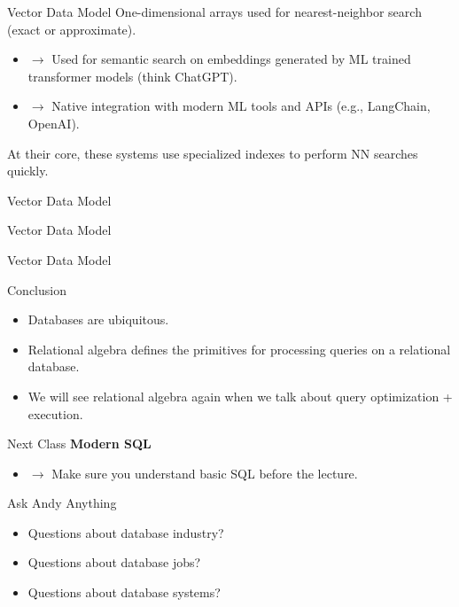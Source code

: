 \documentclass[aspectratio=169, 10pt]{beamer}
\begin{document}
\begin{frame}{Vector Data Model}
    One-dimensional arrays used for nearest-neighbor search (exact or approximate).
    \begin{itemize}
        \item $\rightarrow$ Used for semantic search on embeddings generated by ML trained transformer models (think ChatGPT).
        \item $\rightarrow$ Native integration with modern ML tools and APIs (e.g., LangChain, OpenAI).
    \end{itemize}
    At their core, these systems use specialized indexes to perform NN searches quickly.
    \vspace{1em}
    \centering

\end{frame}

\begin{frame}{Vector Data Model}
    \centering
  
\end{frame}

\begin{frame}{Vector Data Model}
    \centering
   
\end{frame}

\begin{frame}{Vector Data Model}
    \centering
    
\end{frame}

\begin{frame}{Conclusion}
    \begin{itemize}
        \item Databases are ubiquitous.
        \item Relational algebra defines the primitives for processing queries on a relational database.
        \item We will see relational algebra again when we talk about query optimization + execution.
    \end{itemize}
\end{frame}

\begin{frame}{Next Class}
    \Large
    \textbf{Modern SQL}
    \vspace{1em}
    \normalsize
    \begin{itemize}
        \item $\rightarrow$ Make sure you understand basic SQL before the lecture.
    \end{itemize}
\end{frame}

\begin{frame}{Ask Andy Anything}
    \begin{itemize}
        \item Questions about database industry?
        \item Questions about database jobs?
        \item Questions about database systems?
    \end{itemize}
\end{frame}
\end{document}
